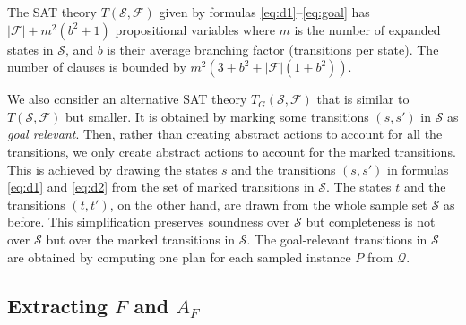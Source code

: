 \documentclass[letterpaper]{article} %
\newcommand{\Omit}[1]{}
\newcommand{\Q}{\mathcal{Q}}
\newcommand{\F}{\mathcal{F}}
\renewcommand{\S}{\mathcal{S}}
\begin{document}
\medskip

The SAT theory $T(\S,\F)$ given by formulas \eqref{eq:d1}--\eqref{eq:goal}
has $|\F| + m^2 (b^2 + 1)$ propositional variables
where $m$ is the number of expanded states in $\S$, and $b$ is their average branching factor (transitions per state).
The number of clauses is bounded by $m^2(3 + b^2 + |\F|(1+b^2))$. %
%
\Omit{
This means  that  $50$ expanded states in the sample set
with an average branching factor of $10$, and a set $\F$
with $400$ candidate features, can generate up to $10^8$ clauses.
While this is a loose upper bound for the number of clauses that
follow from the implication   $D_2(s, s', t, t') \Leftharrow\ \textstyle\bigvee_f  selected(f)$
in (\label{eq:d2}) and the numbers are further reduced by symmetry consideration,
this is still a large number. ..
}
%

We also consider an alternative SAT theory $T_G(\S,\F)$ that is similar to $T(\S,\F)$
but  smaller. It is obtained by marking  some transitions $(s,s')$ in $\S$  as  \emph{goal relevant}.
Then, rather than creating abstract  actions to account for all the transitions, we only create
abstract actions to account for the marked transitions. This is achieved by drawing the states
$s$ and the transitions $(s,s')$ in formulas \eqref{eq:d1} and \eqref{eq:d2} from the
set of marked transitions in $\S$. The states $t$ and the transitions $(t,t')$, on the other hand,
are drawn from the whole sample set $\S$ as before. This simplification preserves soundness over $\S$
but completeness is not over $\S$ but over the marked transitions in $\S$. 
The goal-relevant transitions in $\S$ are obtained by computing one plan
for each sampled instance $P$ from $\Q$.

\Omit{
If the set of marked transitions is much smaller than the full sample set, %
$T_G(\S,\F)$ is much smaller than $T(\S,\F)$.
$T_G(\S,\F)$ guarantees soundness relative to $\S$
but completeness only relative to the subset of goal-relevant transitions in $\S$.
Yet this does not affect the resulting formal guarantees, which depend only on soundness. 
}


\subsection{Extracting $F$ and  $A_F$}
\end{document}
